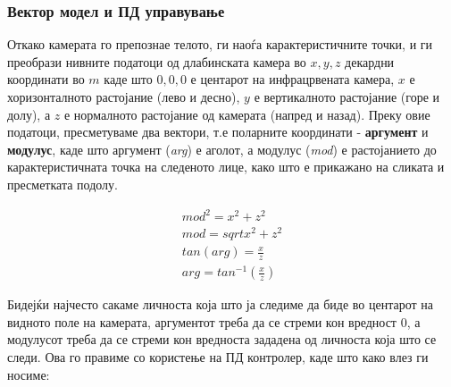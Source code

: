 \documentclass[12pt]{article}
\begin{document}
\subsubsection{Вектор модел и ПД управување}

      Откако камерата го препознае телото, ги наоѓа карактеристичните точки, и ги преобрази нивните податоци од длабинската камера во $ x,y,z $ декардни координати во $ m $ каде што $ 0,0,0 $ е центарот на инфрацрвената камера, $x$ е хоризонталното растојание (лево и десно), $y$ е вертикалното растојание (горе и долу), а $z$ е нормалното растојание од камерата (напред и назад). Преку овие податоци, пресметуваме два вектори, т.е поларните координати - \textbf{аргумент} и \textbf{модулус}, каде што аргумент (\textit{arg}) е аголот, а модулус (\textit{mod}) е растојанието до карактеристичната точка на следеното лице, како што е прикажано на сликата и пресметката подолу.


      \begin{equation} \label{eq:cart2pol}
        \begin{aligned}
    	  mod^{2} = x^{2} + z^{2} \\
        mod = sqrt{x^{2} + z^{2}} \\
        tan(arg) = \frac{x}{z} \\
        arg = tan^{-1}(\frac{x}{z})
        \end{aligned}
        \end{equation}

      Бидејќи најчесто сакаме личноста која што ја следиме да биде во центарот на видното поле на камерата, аргументот треба да се стреми кон вредност 0, а модулусот треба да се стреми кон вредноста зададена од личноста која што се следи. Ова го правиме со користење на ПД контролер, каде што како влез ги носиме:
\end{document}
